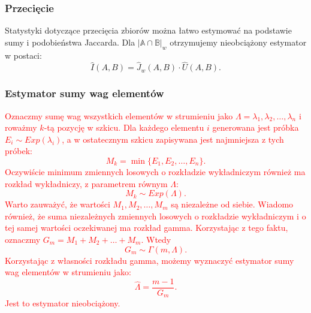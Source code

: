     \subsubsection*{Przecięcie}
    Statystyki dotyczące przecięcia zbiorów można łatwo estymować na podstawie sumy i podobieństwa Jaccarda. Dla $|\mathbb{A} \cap \mathbb{B}|_{w}$ otrzymujemy nieobciążony estymator w postaci:
    \[
        \hat{I}(A, B) = \hat{J}_w(A, B) \cdot \hat{U}(A, B).  
    \]
    \subsubsection*{Estymator sumy wag elementów}
    \label{sec:weight_sum_estimator}
    \textcolor{red}{Oznaczmy sumę wag wszystkich elementów w strumieniu jako $\Lambda = \lambda_1, \lambda_2, \dots, \lambda_n$ i roważmy $k$-tą pozycję w szkicu. Dla każdego elementu $i$ generowana jest próbka $E_i \sim Exp(\lambda_i)$, a w ostatecznym szkicu zapisywana jest najmniejsza z tych próbek: 
    \[
        M_k = \min{\{E_1, E_2, \dots, E_n\}}.
    \]
    Oczywiście minimum zmiennych losowych o rozkładzie wykładniczym również ma rozkład wykładniczy, z parametrem równym $\Lambda$:
    \[
        M_k \sim Exp(\Lambda).
    \]
    Warto zauważyć, że wartości $M_1, M_2, \dots, M_m$ są niezależne od siebie. Wiadomo również, że suma niezależnych zmiennych losowych o rozkładzie wykładniczym i o tej samej wartości oczekiwanej ma rozkład gamma. Korzystając z tego faktu, oznaczmy $G_m = M_1 + M_2 + \dots + M_m$. Wtedy 
    \[
        G_m \sim \Gamma(m, \Lambda).
    \]
    Korzystając z własności rozkładu gamma, możemy wyznaczyć estymator sumy wag elementów w strumieniu jako:
    \[
        \hat{\Lambda} = \frac{m - 1}{G_m}.
    \]
    Jest to estymator nieobciążony.
    }

